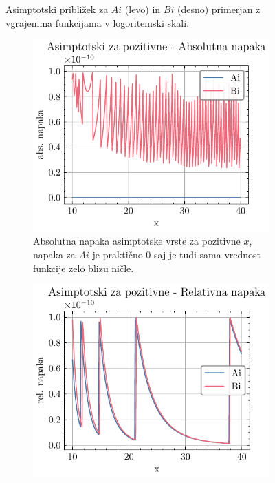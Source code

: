 \documentclass[slovene,11pt,a4paper]{article}
\begin{document}
\begin{figure}[h]
\begin{minipage}{0.48\textwidth}
  \end{minipage}
  \caption{Asimptotski približek za $Ai$ (levo) in $Bi$ (desno) primerjan z vgrajenima funkcijama v logoritemski skali.}
  \label{fig: pos_draw}
\end{figure}


\begin{figure}[H]
  \centering

  \begin{subfigure}{0.48\textwidth}
    \centering
    \includegraphics[width=\linewidth]{graphs/pos_abs_err.pdf}
    \caption{Absolutna napaka asimptotske vrste za pozitivne $x$, napaka za $Ai$ je praktično $0$ saj je tudi sama vrednost funkcije zelo blizu ničle.}
    \label{fig:a}
  \end{subfigure}\hfill
  \begin{subfigure}{0.48\textwidth}
    \centering
    \includegraphics[width=\linewidth]{graphs/pos_rel_err.pdf}

\end{subfigure}
\end{figure}
\end{document}
